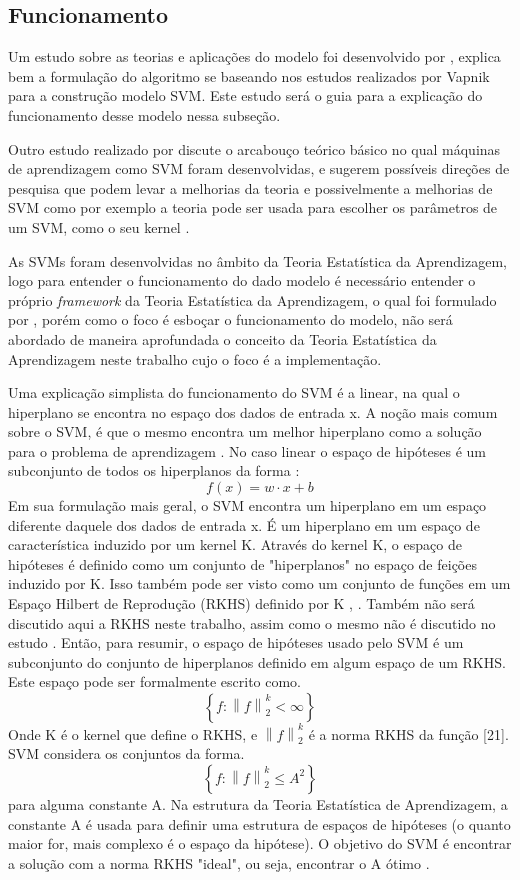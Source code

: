  \subsection{Funcionamento}

 Um estudo sobre as teorias e aplicações do modelo foi desenvolvido por , explica bem a formulação do algoritmo se baseando nos estudos realizados por Vapnik para a construção modelo SVM. Este estudo será o guia para a explicação do funcionamento desse modelo nessa subseção.

Outro estudo realizado por  discute o arcabouço teórico básico no qual máquinas de aprendizagem como SVM foram desenvolvidas, e sugerem possíveis direções de pesquisa que podem levar a melhorias da teoria e possivelmente a melhorias de SVM como por exemplo a teoria pode ser usada para escolher os parâmetros de um SVM, como o seu kernel \cite{vapnik1998statistical}.
 
As SVMs foram desenvolvidas no âmbito da Teoria Estatística da Aprendizagem, logo para entender o funcionamento do dado modelo é necessário entender o próprio \textit{framework} da Teoria Estatística da Aprendizagem, o qual foi formulado por , porém como o foco é esboçar o funcionamento do modelo, não será abordado de maneira aprofundada o conceito da Teoria Estatística da Aprendizagem neste trabalho cujo o foco é a implementação. 
 
Uma explicação simplista do funcionamento do SVM é a linear, na qual o hiperplano se encontra no espaço dos dados de entrada x. A noção mais comum sobre o SVM, é que o mesmo encontra um melhor hiperplano como a solução para o problema de aprendizagem \cite{vapnik1998statistical}. No caso linear o espaço de hipóteses é um subconjunto de todos os hiperplanos da forma \cite{evgeniou1999support}:\[f(x)= w\cdot x +b\]
Em sua formulação mais geral, o SVM encontra um hiperplano em um espaço diferente daquele dos dados de entrada x. É um hiperplano em um espaço de característica induzido por um kernel K. Através do kernel K, o espaço de hipóteses é definido como um conjunto de "hiperplanos" no espaço de feições induzido por K. Isso também pode ser visto como um conjunto de funções em um Espaço Hilbert de Reprodução (RKHS) definido por K \cite{wahba1990spline}, \cite{vapnik1998statistical}. Também não será discutido aqui a RKHS neste trabalho, assim como o mesmo não é discutido no estudo \cite{evgeniou1999support}. Então, para resumir, o espaço de hipóteses usado pelo SVM é um subconjunto do conjunto de hiperplanos definido em algum espaço de um RKHS. Este espaço pode ser formalmente escrito como.\[\left \{ f:\left \| f \right \|_{2}^{k} < \infty \right \}\]
Onde K é o kernel que define o RKHS, e $ \left \| f \right \|_{2}^{k} $  é a norma RKHS da função [21]. SVM considera os conjuntos da forma. \[\left \{ f:\left \| f \right \|_{2}^{k} \leq A^{2} \right \}\] para alguma constante A. Na estrutura da Teoria Estatística de Aprendizagem, a constante A é usada para definir uma estrutura de espaços de hipóteses (o quanto maior for, mais complexo é o espaço da hipótese). O objetivo do SVM é encontrar a solução com a norma RKHS "ideal", ou seja, encontrar o A ótimo \cite{evgeniou1999support}.

